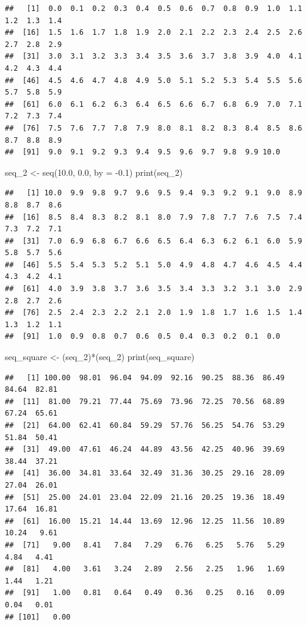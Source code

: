 \documentclass[
]{book}
\newenvironment{Shaded}{\begin{snugshade}}{\end{snugshade}}
\newcommand{\AttributeTok}[1]{\textcolor[rgb]{0.77,0.63,0.00}{#1}}
\newcommand{\FloatTok}[1]{\textcolor[rgb]{0.00,0.00,0.81}{#1}}
\newcommand{\FunctionTok}[1]{\textcolor[rgb]{0.00,0.00,0.00}{#1}}
\newcommand{\NormalTok}[1]{#1}
\newcommand{\OtherTok}[1]{\textcolor[rgb]{0.56,0.35,0.01}{#1}}
\newcommand{\SpecialCharTok}[1]{\textcolor[rgb]{0.00,0.00,0.00}{#1}}
\begin{document}
\begin{verbatim}
##   [1]  0.0  0.1  0.2  0.3  0.4  0.5  0.6  0.7  0.8  0.9  1.0  1.1  1.2  1.3  1.4
##  [16]  1.5  1.6  1.7  1.8  1.9  2.0  2.1  2.2  2.3  2.4  2.5  2.6  2.7  2.8  2.9
##  [31]  3.0  3.1  3.2  3.3  3.4  3.5  3.6  3.7  3.8  3.9  4.0  4.1  4.2  4.3  4.4
##  [46]  4.5  4.6  4.7  4.8  4.9  5.0  5.1  5.2  5.3  5.4  5.5  5.6  5.7  5.8  5.9
##  [61]  6.0  6.1  6.2  6.3  6.4  6.5  6.6  6.7  6.8  6.9  7.0  7.1  7.2  7.3  7.4
##  [76]  7.5  7.6  7.7  7.8  7.9  8.0  8.1  8.2  8.3  8.4  8.5  8.6  8.7  8.8  8.9
##  [91]  9.0  9.1  9.2  9.3  9.4  9.5  9.6  9.7  9.8  9.9 10.0
\end{verbatim}

\begin{Shaded}
\begin{Highlighting}[]
\NormalTok{seq\_2 }\OtherTok{\textless{}{-}} \FunctionTok{seq}\NormalTok{(}\FloatTok{10.0}\NormalTok{, }\FloatTok{0.0}\NormalTok{, }\AttributeTok{by =} \SpecialCharTok{{-}}\FloatTok{0.1}\NormalTok{)}
\FunctionTok{print}\NormalTok{(seq\_2)}
\end{Highlighting}
\end{Shaded}

\begin{verbatim}
##   [1] 10.0  9.9  9.8  9.7  9.6  9.5  9.4  9.3  9.2  9.1  9.0  8.9  8.8  8.7  8.6
##  [16]  8.5  8.4  8.3  8.2  8.1  8.0  7.9  7.8  7.7  7.6  7.5  7.4  7.3  7.2  7.1
##  [31]  7.0  6.9  6.8  6.7  6.6  6.5  6.4  6.3  6.2  6.1  6.0  5.9  5.8  5.7  5.6
##  [46]  5.5  5.4  5.3  5.2  5.1  5.0  4.9  4.8  4.7  4.6  4.5  4.4  4.3  4.2  4.1
##  [61]  4.0  3.9  3.8  3.7  3.6  3.5  3.4  3.3  3.2  3.1  3.0  2.9  2.8  2.7  2.6
##  [76]  2.5  2.4  2.3  2.2  2.1  2.0  1.9  1.8  1.7  1.6  1.5  1.4  1.3  1.2  1.1
##  [91]  1.0  0.9  0.8  0.7  0.6  0.5  0.4  0.3  0.2  0.1  0.0
\end{verbatim}

\begin{Shaded}
\begin{Highlighting}[]
\NormalTok{seq\_square }\OtherTok{\textless{}{-}}\NormalTok{ (seq\_2)}\SpecialCharTok{*}\NormalTok{(seq\_2)}
\FunctionTok{print}\NormalTok{(seq\_square)}
\end{Highlighting}
\end{Shaded}

\begin{verbatim}
##   [1] 100.00  98.01  96.04  94.09  92.16  90.25  88.36  86.49  84.64  82.81
##  [11]  81.00  79.21  77.44  75.69  73.96  72.25  70.56  68.89  67.24  65.61
##  [21]  64.00  62.41  60.84  59.29  57.76  56.25  54.76  53.29  51.84  50.41
##  [31]  49.00  47.61  46.24  44.89  43.56  42.25  40.96  39.69  38.44  37.21
##  [41]  36.00  34.81  33.64  32.49  31.36  30.25  29.16  28.09  27.04  26.01
##  [51]  25.00  24.01  23.04  22.09  21.16  20.25  19.36  18.49  17.64  16.81
##  [61]  16.00  15.21  14.44  13.69  12.96  12.25  11.56  10.89  10.24   9.61
##  [71]   9.00   8.41   7.84   7.29   6.76   6.25   5.76   5.29   4.84   4.41
##  [81]   4.00   3.61   3.24   2.89   2.56   2.25   1.96   1.69   1.44   1.21
##  [91]   1.00   0.81   0.64   0.49   0.36   0.25   0.16   0.09   0.04   0.01
## [101]   0.00
\end{verbatim}
\end{document}
